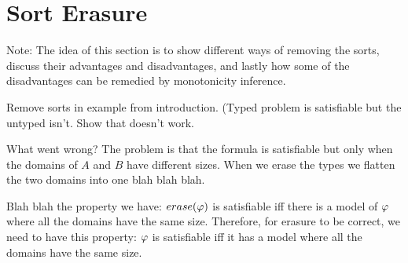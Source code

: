 
\section{Sort Erasure}

Note: The idea of this section is to show different ways of removing the
sorts, discuss their advantages and disadvantages, and lastly
how some of the disadvantages can be remedied by monotonicity inference.


Remove sorts in example from introduction. 
(Typed problem is satisfiable but the untyped isn't.
Show that doesn't work.











What went wrong? The problem is that the formula is satisfiable but only
when the domains of $A$ and $B$ have different sizes. When we erase
the types we flatten the two domains into one blah blah blah.

Blah blah the property we have: $erase(\varphi)$ is satisfiable iff there is
a model of $\varphi$ where all the domains have the same size.
Therefore, for erasure to be correct, we need to have this property:
$\varphi$ is satisfiable iff it has a model where all the domains
have the same size.

